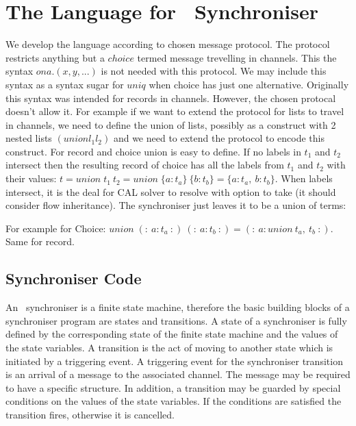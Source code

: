\section{The Language for \ak\ Synchroniser}
We develop the language according to chosen message protocol. The protocol restricts anything but a $choice$ termed message trevelling in channels. This the syntax $on a.(x,y, ...)$ is not needed with this protocol. We may include this syntax as a syntax sugar for $uniq$ when choice has just one alternative. Originally this syntax was intended for records in channels. However, the chosen protocal doesn't allow it. For example if we want to extend the protocol for lists to travel in channels, we need to define the union of lists, possibly as a construct with 2 nested lists $(union l_1 l_2)$ and we need to extend the protocol to encode this construct. For record and choice union is easy to define. If no labels in $t_1$ and $t_2$ intersect then the resulting record of choice has all the labels from $t_1$ and $t_2$ with their values: $t = union \; t_1 \: t_2 = union \; \{a:t_a\} \: \{b:t_b\} = \{a:t_a, \: b:t_b\}$. When labels intersect, it is the deal for CAL solver to resolve with option to take (it should consider flow inheritance). The synchroniser just leaves it to be a union of terms:

For example for Choice: $union \; (: \: a:t_a \: :) \: (: \: a:t_b \: :) = (: \: a:union \: t_a, \: t_b \: :)$.
Same for record.


\subsection{Synchroniser Code}
An \ak\ synchroniser is a finite state machine, therefore the basic building blocks of a synchroniser program are states and transitions. A state of a synchroniser is fully defined by the corresponding state of the finite state machine and the values of the state variables. A transition is the act of moving to another state which is initiated by a triggering event. A triggering event for the synchroniser transition is an arrival of a message to the associated channel. The message may be required to have a specific structure. In addition, a transition may be guarded by special conditions on the values of the state variables. If the conditions are satisfied the transition fires, otherwise it is cancelled.

